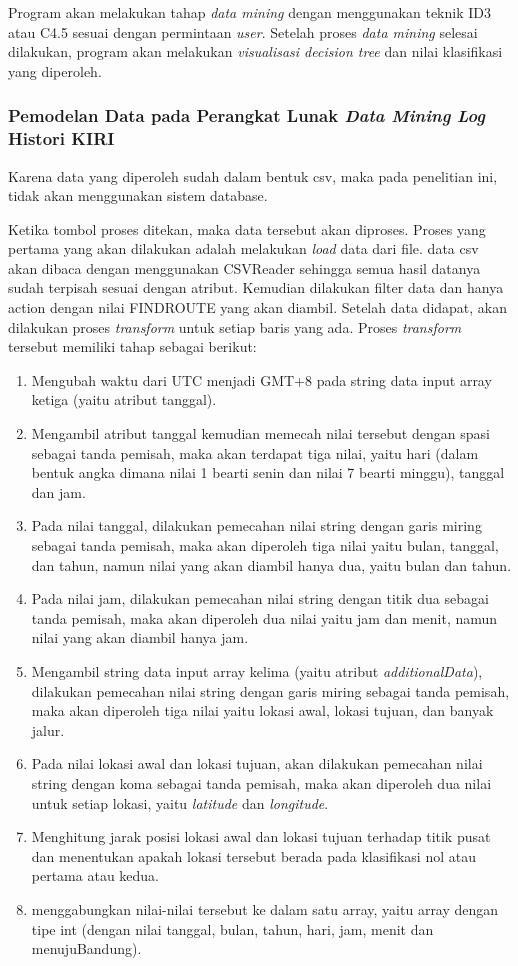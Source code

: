Program akan melakukan tahap \textsl{data mining} dengan menggunakan teknik ID3 atau C4.5 sesuai dengan permintaan \textsl{user}. Setelah proses \textsl{data mining} selesai dilakukan, program akan melakukan \textsl{visualisasi decision tree} dan nilai klasifikasi yang diperoleh.  

\subsubsection{Pemodelan Data pada Perangkat Lunak \textsl{Data Mining Log} Histori KIRI}
Karena data yang diperoleh sudah dalam bentuk csv, maka pada penelitian ini, tidak akan menggunakan sistem database. 

Ketika tombol proses ditekan, maka data tersebut akan diproses. Proses yang pertama yang akan dilakukan adalah melakukan \textsl{load} data dari file. data csv akan dibaca dengan menggunakan CSVReader sehingga semua hasil datanya sudah terpisah sesuai dengan atribut. Kemudian dilakukan filter data dan hanya action dengan nilai FINDROUTE yang akan diambil. Setelah data didapat, akan dilakukan proses \textsl{transform} untuk setiap baris yang ada. Proses \textsl{transform} tersebut memiliki tahap sebagai berikut:
\begin{enumerate}
	\item Mengubah waktu dari UTC menjadi GMT+8 pada string data input array ketiga (yaitu atribut tanggal).
	\item Mengambil atribut tanggal kemudian memecah nilai tersebut dengan spasi sebagai tanda pemisah, maka akan terdapat tiga nilai, yaitu hari (dalam bentuk angka dimana nilai 1 bearti senin dan nilai 7 bearti minggu), tanggal dan jam.
	\item Pada nilai tanggal, dilakukan pemecahan nilai string dengan garis miring sebagai tanda pemisah, maka akan diperoleh tiga nilai yaitu bulan, tanggal, dan tahun, namun nilai yang akan diambil hanya dua, yaitu bulan dan tahun.
	\item Pada nilai jam, dilakukan pemecahan nilai string dengan titik dua sebagai tanda pemisah, maka akan diperoleh dua nilai yaitu jam dan menit, namun nilai yang akan diambil hanya jam.
	\item Mengambil string data input array kelima (yaitu atribut \textsl{additionalData}), dilakukan pemecahan nilai string dengan garis miring sebagai tanda pemisah, maka akan diperoleh tiga nilai yaitu lokasi awal, lokasi tujuan, dan banyak jalur.
	\item Pada nilai lokasi awal dan lokasi tujuan, akan dilakukan pemecahan nilai string dengan koma sebagai tanda pemisah, maka akan diperoleh dua nilai untuk setiap lokasi, yaitu \textsl{latitude} dan \textsl{longitude}.
	\item Menghitung jarak posisi lokasi awal dan lokasi tujuan terhadap titik pusat dan menentukan apakah lokasi tersebut berada pada klasifikasi nol atau pertama atau kedua.
	\item menggabungkan nilai-nilai tersebut ke dalam satu array, yaitu array dengan tipe int (dengan nilai tanggal, bulan, tahun, hari, jam, menit dan menujuBandung).
\end{enumerate}

